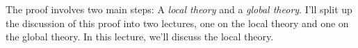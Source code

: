 The proof involves two main steps: A \emph{local theory} and a \emph{global theory}.
I'll split up the discussion of this proof into two lectures, one on the local theory and one on the global theory.
In this lecture, we'll discuss the local theory.

